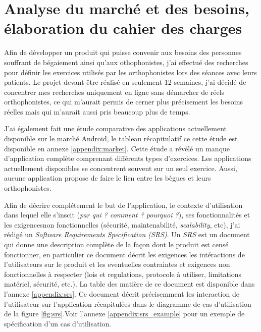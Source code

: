 \section{Analyse du marché et des besoins, élaboration du cahier des charges}
Afin de développer un produit qui puisse convenir aux besoins des personnes souffrant de bégaiement ainsi qu'aux othophonistes, j'ai effectué des recherches pour définir les exercices utilisés par les orthophonistes lors des séances avec leurs patients. Le projet devant être réalisé en seulement 12 semaines, j'ai décidé de concentrer mes recherches uniquement en ligne sans démarcher de réels orthophonistes, ce qui m'aurait permis de cerner plus précisement les besoins réelles mais qui m'aurait aussi pris beaucoup plus de temps.

J'ai également fait une étude comparative des applications actuellement disponible sur le marché Android, le tableau récapitulatif ce cette étude est disponible en annexe \ref{appendix:market}. Cette étude a révélé un manque d'application complète comprenant différents types d'exercices. Les applications actuellement disponibles se concentrent souvent sur un seul exercice. Aussi, aucune application propose de faire le lien entre les bègues et leurs orthophonistes.

Afin de décrire complétement le but de l'application, le contexte d'utilisation dans lequel elle s'inscit (\textit{par qui ? comment ? pourquoi ?}), ses fonctionnalités et les exigencesnon fonctionnelles (sécurité, maintenabilité, \textit{scalability}, etc), j'ai rédigé un \textit{Software Requirements Specification (SRS)}. Un \textit{SRS} est un document qui donne une description complète de la façon dont le produit est censé fonctionner, en particulier ce document décrit les exigences les intéractions de l'utilisateurs sur le produit et les eventuelles contraintes et exigences non fonctionnelles à respecter (lois et regulations, protocole à utiliser, limitations matériel, sécurité, etc.). La table des matière de ce document est disponible dans l'annexe \ref{appendix:srs}. Ce document décrit précisemment les interaction de l'utilisateur sur l'application récapitulées dans le diagramme de cas d'utilisation de la figure \ref{fig:srs}.Voir l'annexe \ref{appendix:srs_example} pour un exemple de spécification d'un cas d'utilisation.

